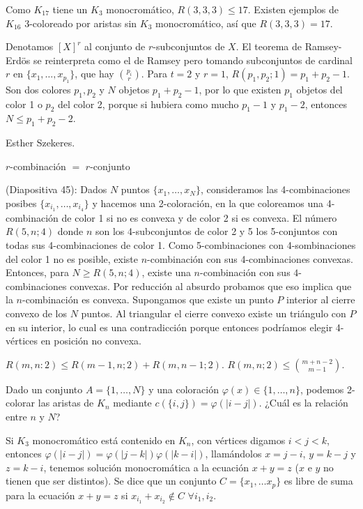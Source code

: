 \documentclass[TGyGC.tex]{subfiles}
\begin{document}
Como $K_{17}$ tiene un $K_3$ monocromático, $R(3,3,3)\leq 17$. Existen ejemplos de $K_16$ 3-coloreado por aristas sin $K_3$ monocromático, así que $R(3,3,3)=17$.

Denotamos $[X]^r$ al conjunto de $r$-subconjuntos de $X$. El teorema de Ramsey-Erdös se reinterpreta como el de Ramsey pero tomando subconjuntos de cardinal $r$ en $\{x_1,\dots, x_{p_1}\}$, que hay $\binom{p_i}{r}$. Para $t=2$ y $r=1$, $R(p_1,p_2;1)=p_1+p_2-1$. Son dos colores $p_1,p_2$ y $N$ objetos $p_1+p_2-1$, por lo que existen $p_1$ objetos del color 1 o $p_2$ del color 2, porque si hubiera como mucho $p_1-1$ y $p_1-2$, entonces $N\leq p_1+p_2-2$.  

Esther Szekeres. 

$r$-combinación $=$ $r$-conjunto


(Diapositiva 45): Dados $N$ puntos $\{x_1,\dots, x_N\}$, consideramos las 4-combinaciones posibes $\{x_{i_1},\dots, x_{i_4}\}$ y hacemos una 2-coloración, en la que coloreamos una 4-combinación de color 1 si no es convexa y de color 2 si es convexa. El número $R(5,n;4)$ donde $n$ son los 4-subconjuntos de color 2 y 5 los 5-conjuntos con todas sus 4-combinaciones de color 1. Como 5-combinaciones con 4-sombinaciones del color 1 no es posible, existe $n$-combinación con sus 4-combinaciones convexas. Entonces, para $N\geq R(5,n;4)$, existe una $n$-combinación con sus $4$-combinaciones convexas. Por reducción al absurdo probamos que eso implica que la $n$-combinación es convexa. Supongamos que existe un punto $P$ interior al cierre convexo de los $N$ puntos. Al triangular el cierre convexo existe un triángulo con $P$ en su interior, lo cual es una contradicción porque entonces podríamos elegir 4-vértices en posición no convexa. 

\begin{teorema}
$R(m,n:2)\leq R(m-1,n;2)+R(m,n-1;2)$. $R(m,n;2)\leq\binom{m+n-2}{m-1}$. 
\end{teorema}


Dado un conjunto $A=\{1,\dots, N\}$ y una coloración $\varphi(x)\in\{1,\dots, n\}$, podemos 2-colorar las aristas de $K_n$ mediante $c(\{i,j\})=\varphi(|i-j|)$. ¿Cuál es la relación entre $n$ y $N$?

Si $K_3$ monocromático está contenido en $K_n$, con vértices digamos $i<j<k$, entonces $\varphi(|i-j|)=\varphi(|j-k|)\varphi(|k-i|)$, llamándolos $x=j-i$, $y=k-j$ y $z=k-i$, tenemos solución monocromática a la ecuación $x+y=z$ ($x$ e $y$ no tienen que ser distintos). Se dice que un conjunto $C=\{x_1,\dots x_p\}$ es libre de suma para la ecuación $x+y=z$ si $x_{i_1}+x_{i_2}\notin C$ $\forall i_1,i_2$. 
\end{document}
